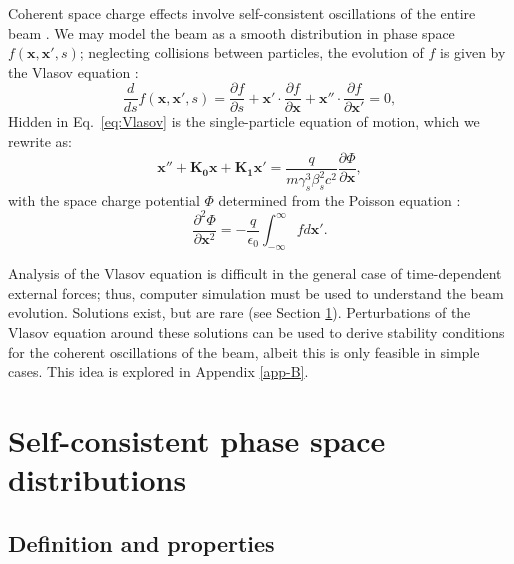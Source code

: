 Coherent space charge effects involve self-consistent oscillations of the entire beam \cite{book:Reiser, Wangler2008, Cousineau2003}. We may model the beam as a smooth distribution in phase space $f(\mathbf{x}, \mathbf{x}', s)$; neglecting collisions between particles, the evolution of $f$ is given by the Vlasov equation \cite{Vlasov1961}:
%
\begin{equation} \label{eq:Vlasov}
    \frac{d}{ds}{f(\mathbf{x}, \mathbf{x}', s)} = 
    \frac{\partial{f}}{\partial{s}} +
    \mathbf{x}' \cdot \frac{\partial{f}}{\partial{\mathbf{x}}} +
    \mathbf{x}'' \cdot \frac{\partial{f}}{\partial{\mathbf{x'}}}
    = 0,
\end{equation}
%
Hidden in Eq.~\eqref{eq:Vlasov} is the single-particle equation of motion, which we rewrite as:
%
\begin{equation}
    \mathbf{x}'' + \mathbf{K_0} \mathbf{x} + \mathbf{K_1} \mathbf{x}'
    =
    \frac{q}{m\gamma_s^3\beta_s^2c^2} \frac{\partial{\Phi}}{\partial\mathbf{x}},
\end{equation}
%
with the space charge potential $\Phi$ determined from the Poisson equation \cite{Jackson1975}:
%
\begin{equation} \label{eq:Poisson}
    \frac{\partial^2{\Phi}}{\partial{\mathbf{x}^2}} = -\frac{q}{\epsilon_0}
    \int_{-\infty}^{\infty}{f}d\mathbf{x}'.
\end{equation}
%

Analysis of the Vlasov equation is difficult in the general case of time-dependent external forces; thus, computer simulation must be used to understand the beam evolution. Solutions exist, but are rare (see Section \ref{sec:Self-consistent phase space distributions}). Perturbations of the Vlasov equation around these solutions can be used to derive stability conditions for the coherent oscillations of the beam, albeit this is only feasible in simple cases. This idea is explored in Appendix \ref{app-B}. 




\section{Self-consistent phase space distributions}\label{sec:Self-consistent phase space distributions}

\subsection{Definition and properties}

